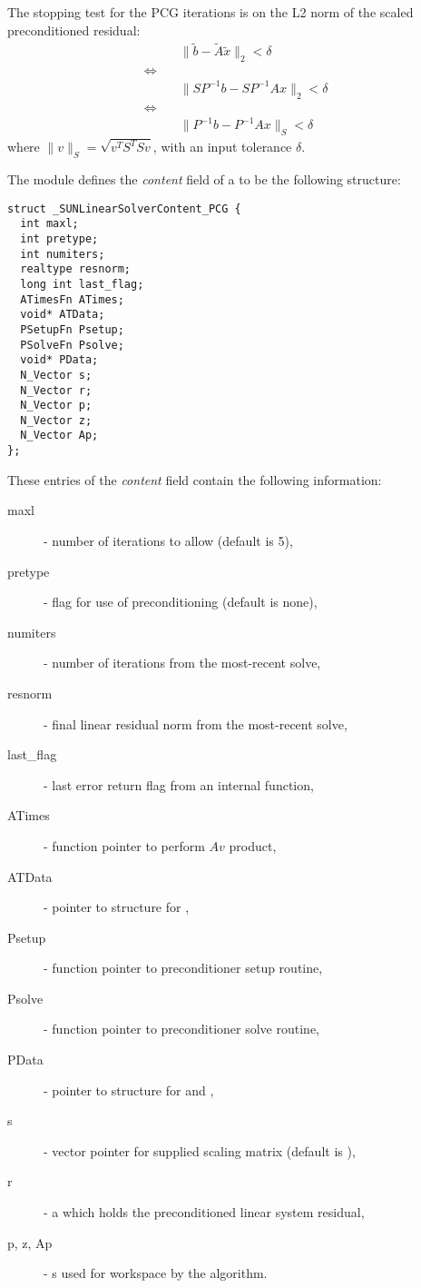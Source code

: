 The stopping test for the PCG iterations is on the L2 norm of the
scaled preconditioned residual:
\begin{align*}
  &\| \tilde{b} - \tilde{A} \tilde{x} \|_2  <  \delta\\
  \Leftrightarrow\quad &\\
  &\| S P^{-1} b - S P^{-1} A x \|_2  <  \delta\\
  \Leftrightarrow\quad &\\
  &\| P^{-1} b - P^{-1} A x \|_S  <  \delta
\end{align*}
where $\| v \|_S = \sqrt{v^T S^T S v}$, with an input tolerance $\delta$.

The {\sunlinsolpcg} module defines the {\em content} field of a
 to be the following structure:
\begin{verbatim} 
struct _SUNLinearSolverContent_PCG {
  int maxl;
  int pretype;
  int numiters;
  realtype resnorm;
  long int last_flag;
  ATimesFn ATimes;
  void* ATData;
  PSetupFn Psetup;
  PSolveFn Psolve;
  void* PData;
  N_Vector s;
  N_Vector r;
  N_Vector p;
  N_Vector z;
  N_Vector Ap;
};
\end{verbatim}
These entries of the \emph{content} field contain the following
information:
\begin{description}
  \item[maxl] - number of {\pcg} iterations to allow (default is 5),
  \item[pretype] - flag for use of preconditioning (default is none),
  \item[numiters] - number of iterations from the most-recent solve,
  \item[resnorm] - final linear residual norm from the most-recent solve,
  \item[last\_flag] - last error return flag from an internal function,
  \item[ATimes] - function pointer to perform $Av$ product,
  \item[ATData] - pointer to structure for ,
  \item[Psetup] - function pointer to preconditioner setup routine,
  \item[Psolve] - function pointer to preconditioner solve routine,
  \item[PData] - pointer to structure for  and ,
  \item[s] - vector pointer for supplied scaling matrix
    (default is ),
  \item[r] - a {\nvector} which holds the preconditioned linear system
    residual,
  \item[p, z, Ap] - {\nvector}s used for workspace by the
    {\pcg} algorithm. 
\end{description}

